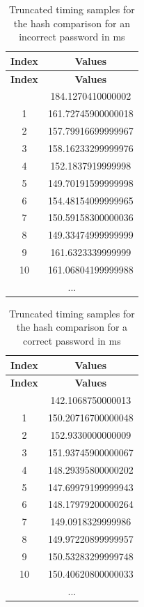 \begin{longtable}{|c|c|}
\caption{Truncated timing samples for the hash comparison for an incorrect password in ms}
\label{table:non_matching_pass_res}
\hline
\rowcolor{grey!15}
\textbf{Index} & \textbf{Values}      \\ \hline
\endfirsthead
\hline
\rowcolor{grey!15}
\textbf{Index} & \textbf{Values}      \\ \hline
\endhead
\hline
\endfoot
\hline
\endlastfoot
0              & 184.1270410000002    \\ \hline
1              & 161.72745900000018   \\ \hline
2              & 157.79916699999967   \\ \hline
3              & 158.16233299999976   \\ \hline
4              & 152.1837919999998    \\ \hline
5              & 149.70191599999998   \\ \hline
6              & 154.48154099999965   \\ \hline
7              & 150.59158300000036   \\ \hline
8              & 149.33474999999999   \\ \hline
9              & 161.6323339999999    \\ \hline
10             & 161.06804199999988   \\ \hline
\multicolumn{2}{|c|}{...}             \\ \hline
\end{longtable}



\begin{longtable}{|c|c|}
\caption{Truncated timing samples for the hash comparison for a correct password in ms}
\label{table:matching_pass_res}
\hline
\rowcolor{grey!15}
\textbf{Index} & \textbf{Values}      \\ \hline
\endfirsthead
\hline
\rowcolor{grey!15}
\textbf{Index} & \textbf{Values}      \\ \hline
\endhead
\hline
\endfoot
\hline
\endlastfoot
0              & 142.1068750000013    \\ \hline
1              & 150.20716700000048   \\ \hline
2              & 152.9330000000009    \\ \hline
3              & 151.93745900000067   \\ \hline
4              & 148.29395800000202   \\ \hline
5              & 147.69979199999943   \\ \hline
6              & 148.17979200000264   \\ \hline
7              & 149.0918329999986    \\ \hline
8              & 149.97220899999957   \\ \hline
9              & 150.53283299999748   \\ \hline
10             & 150.40620800000033   \\ \hline
\multicolumn{2}{|c|}{...}             \\ \hline
\end{longtable}


